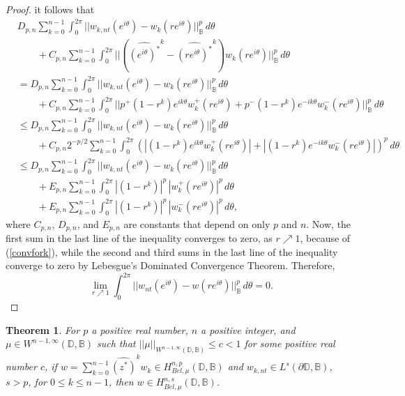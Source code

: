 \documentclass[12pt,reqno]{amsart}
\newtheorem{theorem}{Theorem}[section]
\theoremstyle{definition}
\theoremstyle{remark}
\newcommand{\p}{\partial}
\newcommand{\bc}{\mathbb{B}}
\newcommand{\disk}{\mathbb{D}}
\begin{document}
\begin{proof}
       it follows that 
        \begin{align*}
&           D_{p,n} \sum_{k = 0}^{n-1} \int_0^{2\pi}                ||  w_{k,nt}(e^{i\theta}) -                                   w_k(re^{i\theta}) ||^p_{\bc} \, d\theta \\
            &\quad\quad + C_{p,n} \sum_{k = 0}^{n-1} \int_0^{2\pi}  ||  (\widehat{(e^{i\theta})^*}^k -  \widehat{(re^{i\theta})^*}^k )w_k(re^{i\theta}) ||^p_{\bc} \, d\theta\\
            &= D_{p,n} \sum_{k = 0}^{n-1} \int_0^{2\pi} ||  w_{k,nt}(e^{i\theta}) - w_k(re^{i\theta}) ||^p_{\bc} \, d\theta \\
            &\quad\quad + C_{p,n} \sum_{k = 0}^{n-1} \int_0^{2\pi}  || p^+ (1-r^k)e^{ik\theta}w_k^+(re^{i\theta}) + p^- (1-r^k)e^{-ik\theta} w_k^-(re^{i\theta}) ||^p_{\bc} \, d\theta\\
            &\leq D_{p,n} \sum_{k = 0}^{n-1} \int_0^{2\pi} ||  w_{k,nt}(e^{i\theta}) - w_k(re^{i\theta}) ||^p_{\bc} \, d\theta \\
            &\quad\quad + C_{p,n} 2^{-p/2}\sum_{k = 0}^{n-1} \int_0^{2\pi}  \left( |(1-r^k)e^{ik\theta}w_k^+(re^{i\theta})| + |(1-r^k)e^{-ik\theta} w_k^-(re^{i\theta}) | \right)^p \, d\theta\\
            &\leq D_{p,n} \sum_{k = 0}^{n-1} \int_0^{2\pi} ||  w_{k,nt}(e^{i\theta}) - w_k(re^{i\theta}) ||^p_{\bc} \, d\theta \\
            &\quad\quad + E_{p,n}\sum_{k = 0}^{n-1} \int_0^{2\pi}  |(1-r^k)|^p\, |w_k^+(re^{i\theta})|^p\,d\theta \\
            &\quad\quad + E_{p,n}\sum_{k = 0}^{n-1} \int_0^{2\pi} |(1-r^k)|^p \, | w_k^-(re^{i\theta}) |^p  \, d\theta ,
        \end{align*}
        where $C_{p,n}$, $D_{p,n}$, and $E_{p,n}$ are constants that depend on only $p$ and $n$. Now, the first sum in the last line of the inequality converges to zero, as $r \nearrow 1$, because of (\ref{convfork}), while the second and third sums in the last line of the inequality converge to zero by Lebesgue's Dominated Convergence Theorem. Therefore, 
        \[
            \lim_{r \nearrow 1} \int_0^{2\pi} ||w_{nt}(e^{i\theta}) - w(re^{i\theta}) ||^p_{\bc} \, d\theta  = 0. 
        \]

\end{proof}




\begin{theorem}%
For $p$ a positive real number, $n$ a positive integer, and $\mu \in W^{n-1,\infty}(\disk,\bc)$ such that $||\mu||_{W^{n-1,\infty}(\disk,\bc)}\leq c < 1$ for some positive real number $c$, if $w = \sum_{k=0}^{n-1} \widehat{ (z^*)}^k w_k \in H^{n,p}_{Bel,\mu}(\disk,\bc)$  and $w_{k,nt} \in L^s(\p\disk,\bc)$, $s> p$, for $0 \leq k \leq n-1$, then $w \in H^{n,s}_{Bel,\mu}(\disk,\bc)$. 
\end{theorem}
\end{document}
